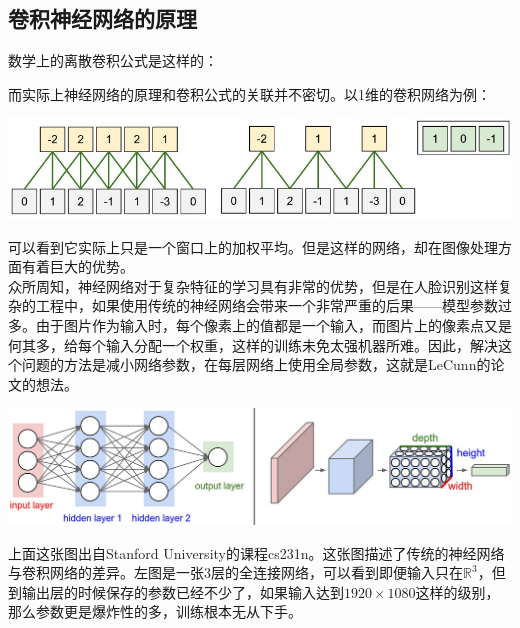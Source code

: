 \documentclass{article}
\begin{document}
\subsection{卷积神经网络的原理}

数学上的离散卷积公式是这样的：\\

\noindent
{}

\bigskip

而实际上神经网络的原理和卷积公式的关联并不密切。以1维的卷积网络为例：\\

\begin{center}
\includegraphics[width=0.8\linewidth]{fig09.jpg}
\end{center}

可以看到它实际上只是一个窗口上的加权平均。但是这样的网络，却在图像处理方面有着巨大的优势。\\

众所周知，神经网络对于复杂特征的学习具有非常的优势，但是在人脸识别这样复杂的工程中，如果使用传统的神经网络会带来一个非常严重的后果——模型参数过多。由于图片作为输入时，每个像素上的值都是一个输入，而图片上的像素点又是何其多，给每个输入分配一个权重，这样的训练未免太强机器所难。因此，解决这个问题的方法是减小网络参数，在每层网络上使用全局参数，这就是LeCunn的论文的想法。\\

\begin{center}
\includegraphics[width=0.8\linewidth]{fig10.jpg}
\end{center}

上面这张图出自Stanford University的课程cs231n。这张图描述了传统的神经网络与卷积网络的差异。左图是一张3层的全连接网络，可以看到即便输入只在$\mathbb{R}^3$，但到输出层的时候保存的参数已经不少了，如果输入达到$1920 \times 1080$这样的级别，那么参数更是爆炸性的多，训练根本无从下手。\\
\end{document}
